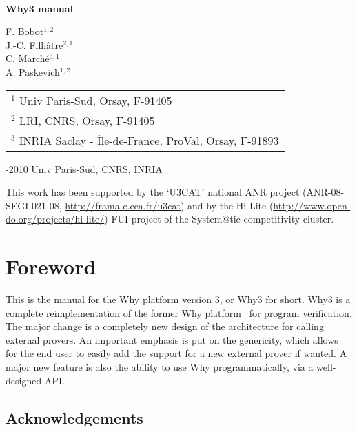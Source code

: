 \documentclass[a4paper,11pt,twoside,openright]{memoir}
\begin{document}
\thispagestyle{empty}

\begin{center}

~

\vfill

{\Huge\bfseries Why3 manual}

\vfill

{\Large F. Bobot$^{1,2}$ \\ 
J.-C. Filli\^atre$^{2,1}$  \\ 
C. March\'e$^{3,1}$ \\ 
A. Paskevich$^{1,2}$}

\vfill

\begin{tabular}{l}
$^1$ Univ Paris-Sud, Orsay, F-91405 \\
$^2$ LRI, CNRS, Orsay, F-91405 \\
$^3$ INRIA Saclay - \^Ile-de-France, ProVal, Orsay, F-91893 
\end{tabular}

\vfill

\begin{flushleft}
  -2010 Univ Paris-Sud, CNRS, INRIA

  This work has been supported by the `U3CAT' national ANR project
  (ANR-08-SEGI-021-08, \url{http://frama-c.cea.fr/u3cat}) and by the
  Hi-Lite (\url{http://www.open-do.org/projects/hi-lite/}) FUI project of the
  System@tic competitivity cluster.

\end{flushleft}
\end{center}

\cleardoublepage

\tableofcontents

\chapter*{Foreword}

This is the manual for the Why platform version 3, or Why3 for
short. Why3 is a complete reimplementation of the former Why
platform~\cite{filliatre07cav} for program verification.  The major
change is a completely new design of the architecture for calling
external provers. An important emphasis is put on the genericity,
which allows for the end user to easily add the support for a new
external prover if wanted.  A major new feature is also the ability
to use Why programmatically, via a well-designed API.

\section*{Acknowledgements}
\end{document}
